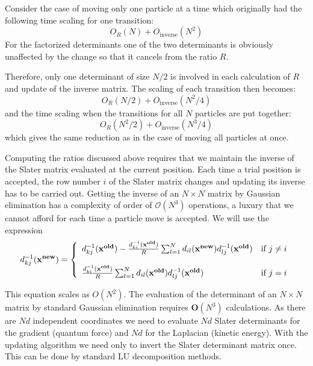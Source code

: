 Consider the case of moving only one particle  at a time which
originally had the following time scaling for one transition:
\[
O_R(N)+O_\mathrm{inverse}(N^2)
\]
For the factorized determinants one of the two determinants is
obviously unaffected by the change so that it cancels from the ratio
$R$. 

Therefore, only one determinant of size $N/2$ is involved in each
calculation of $R$ and update of the inverse matrix. The scaling of
each transition then becomes:
\[
O_R(N/2)+O_\mathrm{inverse}(N^2/4)
\]
and the time scaling when the transitions for all $N$ particles are
put together:
\[
O_R(N^2/2)+O_\mathrm{inverse}(N^3/4)
\]
which gives the same reduction as in the case of moving all particles
at once.

Computing the ratios discussed above requires that we maintain 
the inverse of the Slater matrix evaluated at the current position. 
Each time a trial position is accepted, the row number $i$ of the Slater 
matrix changes and updating its inverse has to be carried out. 
Getting the inverse of an $N \times N$ matrix by Gaussian elimination has a 
complexity of order of $\mathcal{O}(N^3)$ operations, a luxury that we 
cannot afford for each time a particle  move is accepted.
We will use the expression
\begin{equation}
\label{updatingInverse}
d^{-1}_{kj}(\mathbf{x^{new}}) = \left\{\begin{array}{l l}
  d^{-1}_{kj}(\mathbf{x^{old}}) - \frac{d^{-1}_{ki}(\mathbf{x^{old}})}{R} \sum_{l=1}^{N} d_{il}(\mathbf{x^{new}})  d^{-1}_{lj}(\mathbf{x^{old}}) & \mbox{if $j \neq i$}\nonumber \\ \\
 \frac{d^{-1}_{ki}(\mathbf{x^{old}})}{R} \sum_{l=1}^{N} d_{il}(\mathbf{x^{old}}) d^{-1}_{lj}(\mathbf{x^{old}}) & \mbox{if $j=i$}
\end{array} \right.
\end{equation}

This equation scales as $O(N^2)$.
The evaluation of the determinant of an $N \times N$ matrix by standard Gaussian elimination 
requires $\mathbf{O}(N^3)$
calculations. 
As there are $Nd$ independent coordinates we need to evaluate $Nd$ Slater determinants 
for the gradient (quantum force) and $Nd$ for the Laplacian (kinetic energy). 
With the updating algorithm we need only to invert the Slater 
determinant matrix once. This can be done by standard LU decomposition methods.


